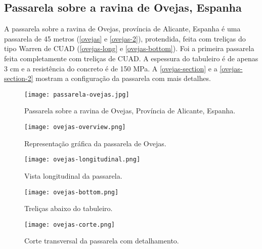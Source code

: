 \subsection{Passarela sobre a ravina de Ovejas, Espanha}

A passarela sobre a ravina de Ovejas, província de Alicante, Espanha é uma passarela de 45 metros (\autoref{ovejas} e \autoref{ovejas-2}), protendida, feita com treliças do tipo Warren de CUAD (\autoref{ovejas-long} e \autoref{ovejas-bottom}). Foi a primeira passarela feita completamente com treliças de CUAD. A espessura do tabuleiro é de apenas 3 cm e a resistência do concreto é de 150 MPa. A \autoref{ovejas-section} e a \autoref{ovejas-section-2} mostram a configuração  da passarela com mais detalhes.

\begin{figure}[htb]
	\caption{\label{ovejas}Passarela sobre a ravina de Ovejas, Província de Alicante, Espanha.}
	\begin{center}
	    \texttt{[image: passarela-ovejas.jpg]}
	\end{center}
\end{figure}

\begin{figure}[htb]
	\caption{\label{ovejas-2}Representação gráfica da passarela de Ovejas.}
	\begin{center}
	    \texttt{[image: ovejas-overview.png]}
	\end{center}
\end{figure}

\begin{figure}[htb]
	\caption{\label{ovejas-long}Vista longitudinal da passarela.}
	\begin{center}
	    \texttt{[image: ovejas-longitudinal.png]}
	\end{center}
\end{figure}

\begin{figure}[htb]
	\caption{\label{ovejas-bottom}Treliças abaixo do tabuleiro.}
	\begin{center}
	    \texttt{[image: ovejas-bottom.png]}
	\end{center}
\end{figure}

\begin{figure}[htb]
	\caption{\label{ovejas-section} Corte transversal da passarela com detalhamento.}
	\begin{center}
	    \texttt{[image: ovejas-corte.png]}
	\end{center}
\end{figure}

